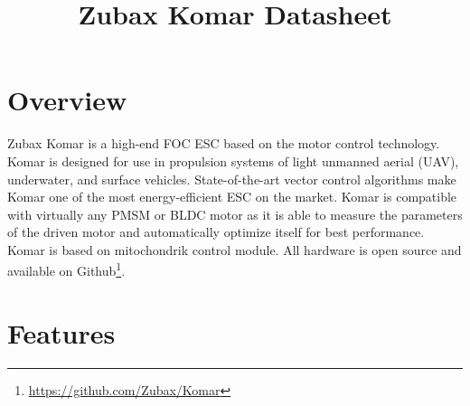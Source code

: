 \documentclass{../document_templates/documentation_template_latex/zubaxdoc}
\title{Zubax Komar Datasheet}
\begin{document}
\frontmatter
\begin{titlepage}

\section*{Overview}

Zubax Komar is a high-end FOC ESC based on the  motor control technology. Komar is designed for
use in propulsion systems of light unmanned aerial (UAV), underwater, and surface vehicles. State-of-the-art vector
control algorithms make Komar one of the most energy-efficient ESC on the market. Komar is compatible with virtually
any PMSM or BLDC motor as it is able to measure the parameters of the driven motor and automatically optimize
itself for best performance. Komar is based on \mbox{mitochondrik} control module.
All hardware is open source and available on Github\footnote{\url{https://github.com/Zubax/Komar}}.

\section*{Features}


\end{titlepage}
\end{document}
